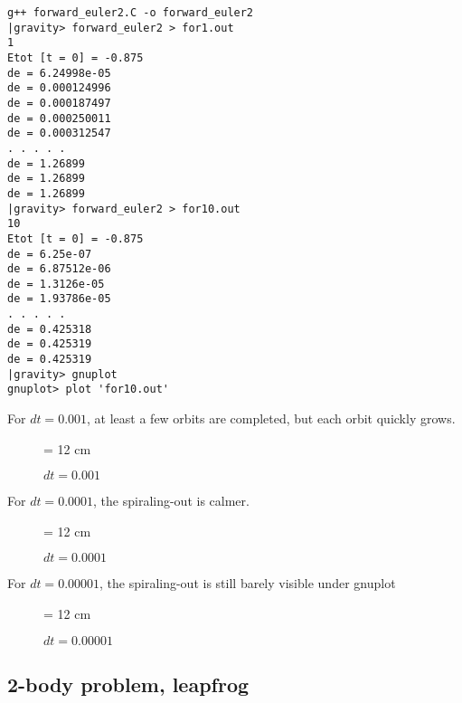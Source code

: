\documentclass{book}
\def\code#1{{\small}}
\begin{document}
\begin{small}
\begin{verbatim}
g++ forward_euler2.C -o forward_euler2
|gravity> forward_euler2 > for1.out
1
Etot [t = 0] = -0.875
de = 6.24998e-05
de = 0.000124996
de = 0.000187497
de = 0.000250011
de = 0.000312547
. . . . .
de = 1.26899
de = 1.26899
de = 1.26899
|gravity> forward_euler2 > for10.out
10
Etot [t = 0] = -0.875
de = 6.25e-07
de = 6.87512e-06
de = 1.3126e-05
de = 1.93786e-05
. . . . .
de = 0.425318
de = 0.425319
de = 0.425319
|gravity> gnuplot
gnuplot> plot 'for10.out'
\end{verbatim}
\end{small}

For $dt = 0.001$, at least a few orbits are completed, but each orbit
quickly grows.

\begin{figure}
\begin{center}
\leavevmode
\epsfxsize = 12 cm
\caption{$dt = 0.001$}
\label{fig:for10}
\end{center}
\end{figure}

For $dt = 0.0001$, the spiraling-out is calmer.

\begin{figure}
\begin{center}
\leavevmode
\epsfxsize = 12 cm
\caption{$dt = 0.0001$}
\label{fig:for100}
\end{center}
\end{figure}

For $dt = 0.00001$, the spiraling-out is still barely visible under gnuplot

\begin{figure}
\begin{center}
\leavevmode
\epsfxsize = 12 cm
\caption{$dt = 0.00001$}
\label{fig:for1000}
\end{center}
\end{figure}

\subsection{2-body problem, leapfrog}

\code{leapfrog1.C}
\end{document}
